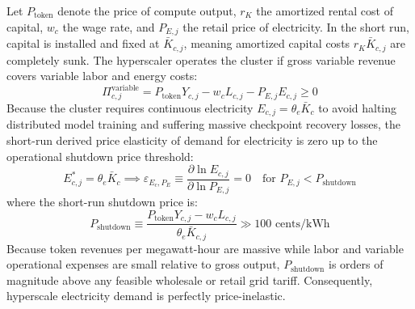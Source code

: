 \documentclass[11pt,a4paper]{article}
\begin{document}
Let $P_{\text{token}}$ denote the price of compute output, $r_K$ the amortized rental cost of capital, $w_c$ the wage rate, and $P_{E,j}$ the retail price of electricity. In the short run, capital is installed and fixed at $\bar{K}_{c,j}$, meaning amortized capital costs $r_K \bar{K}_{c,j}$ are completely sunk. The hyperscaler operates the cluster if gross variable revenue covers variable labor and energy costs:
\begin{equation}
    \Pi_{c,j}^{\text{variable}} = P_{\text{token}} Y_{c,j} - w_c L_{c,j} - P_{E,j} E_{c,j} \ge 0
\end{equation}
Because the cluster requires continuous electricity $E_{c,j} = \theta_e \bar{K}_c$ to avoid halting distributed model training and suffering massive checkpoint recovery losses, the short-run derived price elasticity of demand for electricity is zero up to the operational shutdown price threshold:
\begin{equation}\label{eq:pshutdown}
    E_{c,j}^* = \theta_e \bar{K}_c \implies \varepsilon_{E_c, P_E} \equiv \frac{\partial \ln E_{c,j}}{\partial \ln P_{E,j}} = 0 \quad \text{for } P_{E,j} < P_{\text{shutdown}}
\end{equation}
where the short-run shutdown price is:
\begin{equation}
    P_{\text{shutdown}} \equiv \frac{P_{\text{token}} Y_{c,j} - w_c L_{c,j}}{\theta_e \bar{K}_{c,j}} \gg 100\text{ cents/kWh}
\end{equation}
Because token revenues per megawatt-hour are massive while labor and variable operational expenses are small relative to gross output, $P_{\text{shutdown}}$ is orders of magnitude above any feasible wholesale or retail grid tariff. Consequently, hyperscale electricity demand is perfectly price-inelastic.
\end{document}
